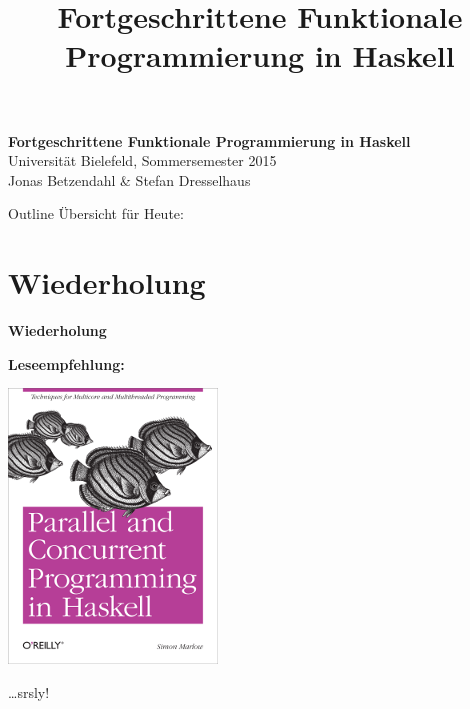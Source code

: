 \documentclass{beamer}
\title{Fortgeschrittene Funktionale Programmierung in Haskell}
\begin{document}
  

  \begin{frame}
  \begin{center}
    \huge\textbf{Fortgeschrittene Funktionale Programmierung in Haskell}\\ \bigskip
    \LARGE Universität Bielefeld, Sommersemester 2015\\ \bigskip
    \large Jonas Betzendahl \& Stefan Dresselhaus
    \end{center}
  \end{frame}

\begin{frame}[allowframebreaks]{Outline}
\vfill
Übersicht für Heute:\smallskip

\tableofcontents
\end{frame}

\section{Wiederholung}


\begin{frame}

\begin{center}
\Large
\textbf{Wiederholung}
\end{center}

\end{frame}


\begin{frame}

\textbf{Leseempfehlung:}

\begin{center}
\includegraphics[scale=0.5]{../Woche6/parcur.png} 
\end{center}
\pause

\dots srsly!

\end{frame}
\end{document}
